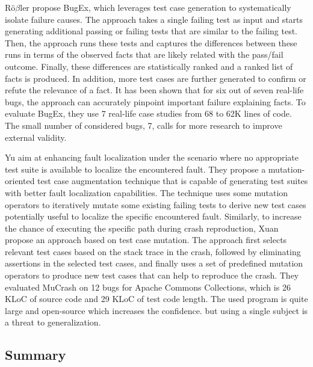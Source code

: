 R{\"o}$\beta$ler \etal\cite{robetaler2012isolating} propose BugEx, which leverages test case generation to systematically isolate failure causes. 
The approach takes a single failing test as input and starts generating additional passing or failing tests that are similar to the failing test. 
Then, the approach runs these tests and captures the differences between these runs in terms of the observed facts that are likely related with the pass/fail outcome. 
Finally, these differences are statistically ranked and a ranked list of facts is produced.
In addition, more test cases are further generated to confirm or refute the relevance of a fact. 
It has been shown that for six out of seven real-life bugs, the approach can accurately pinpoint important failure explaining facts.
To evaluate BugEx, they use 7 real-life case studies from 68 to 62K lines of code. The small number of considered bugs, 7, calls for more research to improve external validity.

Yu \etal\cite{Yu2013} aim at enhancing fault localization under the scenario where no appropriate test suite is available to localize the encountered fault. 
They propose a mutation-oriented test case augmentation technique that is capable of generating test suites with better fault localization capabilities. 
The technique uses some mutation operators to iteratively mutate some existing failing tests to derive new test cases potentially useful to localize the specific encountered fault. 
Similarly, to increase the chance of executing the specific path during crash reproduction, Xuan \etal\cite{Xuan:2015:CRV:2786805.2803206} propose an approach based on test case mutation. 
The approach first selects relevant test cases based on the stack trace in the crash, followed by eliminating assertions in the selected test cases, and finally uses a set of predefined mutation operators to produce new test cases that can help to reproduce the crash. 
They evaluated MuCrash on 12 bugs for Apache Commons Collections, which is  26 KLoC of source code and 29 KLoC of test code length. 
The used program is quite large and open-source which increases the confidence. but using a single subject is a threat to generalization.

\subsection{Summary}
\label{subsec:sota:category-1:subsection}

